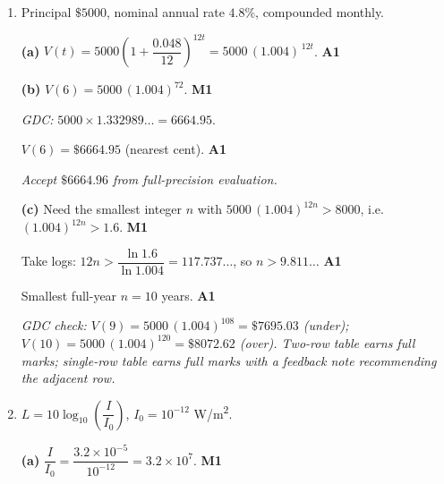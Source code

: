 \documentclass[12pt, twoside]{article}
\begin{document}
\begin{enumerate}[itemsep=0.3cm]
$kt = \ln 125$, hence
$t = \dfrac{\ln 125}{\tfrac{1}{2}\ln 2} = \dfrac{2\ln 125}{\ln 2}$.
\hfill \textbf{M1}

$t = 13.9316\ldots \approx 13.93$ days (2 d.p.). \hfill \textbf{A1}

\emph{Accept $t = 6\log_{2} 5$ as an equivalent exact form; GDC solve
of $8\, e^{(t/2)\ln 2} = 1000$ also acceptable.}

\newpage

\item[5.] [Maximum mark: 6]

Principal $\$5000$, nominal annual rate $4.8\%$, compounded monthly.

\medskip

\textbf{(a)} $V(t) = 5000\!\left(1 + \dfrac{0.048}{12}\right)^{\!12t}
= 5000\,(1.004)^{\,12t}$. \hfill \textbf{A1}

\medskip

\textbf{(b)} $V(6) = 5000\,(1.004)^{72}$. \hfill \textbf{M1}

\emph{GDC: } $5000 \times 1.332989\ldots = 6664.95$.

$V(6) = \$6664.95$ (nearest cent). \hfill \textbf{A1}

\emph{Accept $\$6664.96$ from full-precision evaluation.}

\medskip

\textbf{(c)} Need the smallest integer $n$ with
$5000\,(1.004)^{12n} > 8000$, i.e.\ $(1.004)^{12n} > 1.6$.
\hfill \textbf{M1}

Take logs: $12n > \dfrac{\ln 1.6}{\ln 1.004} = 117.737\ldots$, so
$n > 9.811\ldots$ \hfill \textbf{A1}

Smallest full-year $n = 10$ years. \hfill \textbf{A1}

\emph{GDC check: $V(9) = 5000\,(1.004)^{108} = \$7695.03$ (under);
$V(10) = 5000\,(1.004)^{120} = \$8072.62$ (over). Two-row table earns
full marks; single-row table earns full marks with a feedback note
recommending the adjacent row.}

\newpage

\item[6.] [Maximum mark: 6]

$L = 10\log_{10}\!\left(\dfrac{I}{I_{0}}\right)$, $I_{0} = 10^{-12}$
W/m\textsuperscript{2}.

\medskip

\textbf{(a)} $\dfrac{I}{I_{0}} = \dfrac{3.2 \times 10^{-5}}{10^{-12}}
= 3.2 \times 10^{7}$. \hfill \textbf{M1}


\end{enumerate}
\end{document}
